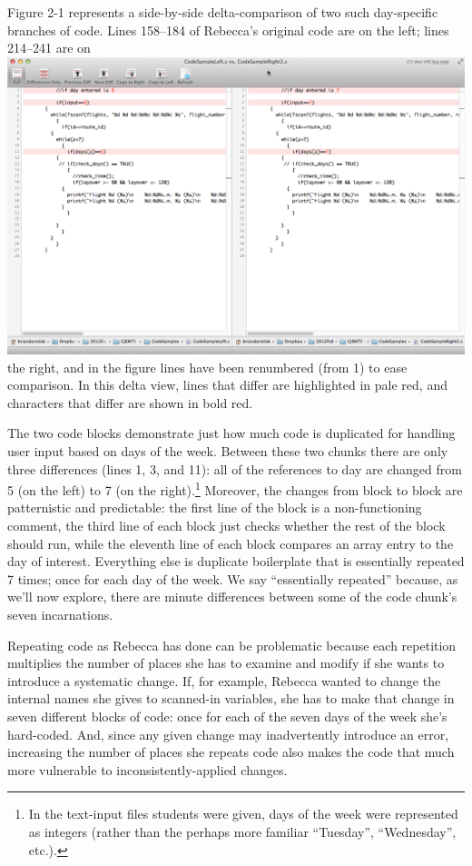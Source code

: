 Figure 2-1 represents a side-by-side delta-comparison of two such day-specific branches of code. Lines 158--184 of Rebecca's original code are on the left; lines 214--241 are on \includegraphics{media/media/image3.png}the right, and in the figure lines have been renumbered (from 1) to ease comparison. In this delta view, lines that differ are highlighted in pale red, and characters that differ are shown in bold red.

The two code blocks demonstrate just how much code is duplicated for handling user input based on days of the week. Between these two chunks there are only three differences (lines 1, 3, and 11): all of the references to day are changed from 5 (on the left) to 7 (on the right).\footnote{In the text-input files students were given, days of the week were represented as integers (rather than the perhaps more familiar ``Tuesday'', ``Wednesday'', etc.).} Moreover, the changes from block to block are patternistic and predictable: the first line of the block is a non-functioning comment, the third line of each block just checks whether the rest of the block should run, while the eleventh line of each block compares an array entry to the day of interest. Everything else is duplicate boilerplate that is essentially repeated 7 times; once for each day of the week. We say ``essentially repeated'' because, as we'll now explore, there are minute differences between some of the code chunk's seven incarnations.

Repeating code as Rebecca has done can be problematic because each repetition multiplies the number of places she has to examine and modify if she wants to introduce a systematic change. If, for example, Rebecca wanted to change the internal names she gives to scanned-in variables, she has to make that change in seven different blocks of code: once for each of the seven days of the week she's hard-coded. And, since any given change may inadvertently introduce an error, increasing the number of places she repeats code also makes the code that much more vulnerable to inconsistently-applied changes.

